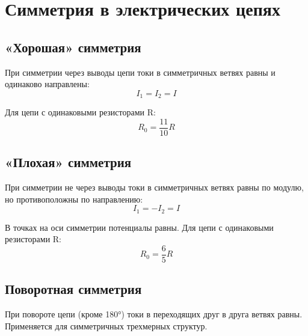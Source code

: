 \documentclass{article}
\begin{document}
\section*{Симметрия в электрических цепях}

\subsection*{«Хорошая» симметрия}
При симметрии через выводы цепи токи в симметричных ветвях равны и одинаково направлены:
\[I_1 = I_2 = I\]

Для цепи с одинаковыми резисторами R:
\[R_0 = \frac{11}{10}R\]

\subsection*{«Плохая» симметрия}
При симметрии не через выводы токи в симметричных ветвях равны по модулю, но противоположны по направлению:
\[I_1 = -I_2 = I\]

В точках на оси симметрии потенциалы равны. Для цепи с одинаковыми резисторами R:
\[R_0 = \frac{6}{5}R\]

\subsection*{Поворотная симметрия}
При повороте цепи (кроме 180°) токи в переходящих друг в друга ветвях равны. Применяется для симметричных трехмерных структур.
\end{document}
